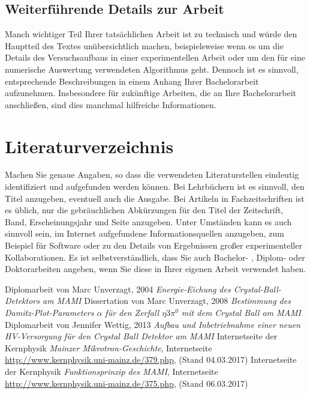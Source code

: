 \documentclass[a4paper,11pt,oneside,final,german,openbib,pdftex]{scrbook}
\begin{document}
\begin{appendix}
\section{Weiterf\"uhrende Details zur Arbeit}

Manch wichtiger Teil Ihrer tats\"achlichen Arbeit ist zu technisch 
und w\"urde den Hauptteil des Textes un\"ubersichtlich machen, 
beispielsweise wenn es um die Details des Versuchsaufbaus in einer 
experimentellen Arbeit oder um den f\"ur eine numerische Auswertung 
verwendeten Algorithmus geht. Dennoch ist es sinnvoll, entsprechende 
Beschreibungen in einem Anhang Ihrer Bachelorarbeit aufzunehmen. 
Insbesondere f\"ur zuk\"unftige Arbeiten, die an Ihre Bachelorarbeit 
anschlie{\ss}en, sind dies manchmal hilfreiche Informationen.

\chapter{Literaturverzeichnis}

Machen Sie genaue Angaben, so dass die verwendeten Literaturstellen 
eindeutig identifiziert und aufgefunden werden k\"onnen.
Bei Lehrb\"uchern \cite{Weinberg:1995mt} ist es sinnvoll, 
den Titel anzugeben, eventuell auch die Ausgabe. Bei Artikeln in 
Fachzeitschriften \cite{Moch:2001zr} ist es \"ublich, nur die 
gebr\"auchlichen Abk\"urzungen f\"ur den Titel der Zeitschrift, Band, 
Erscheinungsjahr und Seite anzugeben. Unter Umst\"anden kann es auch 
sinnvoll sein, im Internet aufgefundene Informationsquellen anzugeben, 
zum Beispiel f\"ur Software \cite{LoopTools} oder zu den Details von 
Ergebnissen gro{\ss}er experimenteller Kollaborationen. Es ist 
selbstverst\"andlich, dass Sie auch Bachelor- \cite{BA:Freund}, 
Diplom- oder Doktorarbeiten angeben, wenn Sie diese in Ihrer eigenen 
Arbeit verwendet haben.
\medskip



\renewcommand{\bibname}{\bfont Literaturverzeichnis} 

\begin{thebibliography}{99}
	
 Diplomarbeit von Marc Unverzagt, 2004 {\em Energie-Eichung des Crystal-Ball-Detektors am MAMI}
 Dissertation von Marc Unverzagt, 2008 {\em Bestimmung des Damitz-Plot-Parameters $\alpha$ für den Zerfall $ \eta 3\pi^{0} $ mit dem Crystal Ball am MAMI}
 Diplomarbeit von Jennifer Wettig, 2013 {\em Aufbau und Inbetriebnahme einer neuen HV-Versorgung für den Crystal Ball Detektor am MAMI}
 Internetseite der Kernphysik {\em Mainzer Mikrotron-Geschichte}, Internetseite \url{http://www.kernphysik.uni-mainz.de/379.php}, (Stand 04.03.2017)
 Internetseite der Kernphysik {\em Funktionsprinzip des MAMI}, Internetseite \url{http://www.kernphysik.uni-mainz.de/375.php}, (Stand 06.03.2017)


\end{thebibliography}
\end{appendix}
\end{document}
